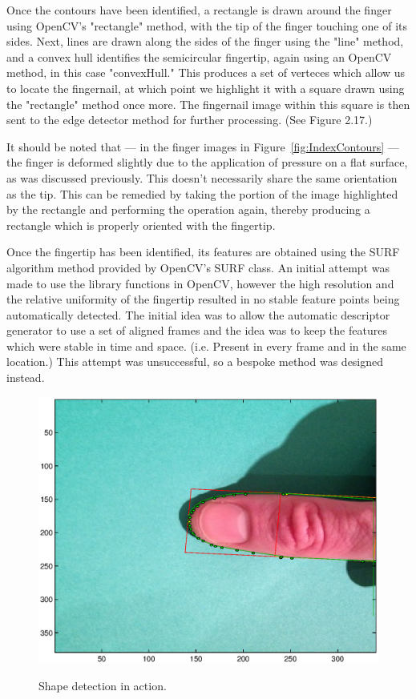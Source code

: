 Once the contours have been identified, a rectangle is drawn around the finger using OpenCV's "rectangle" method, with the tip of the finger touching one of its sides. Next, lines are drawn along the sides of the finger using the "line" method, and a convex hull identifies the semicircular fingertip, again using an OpenCV method, in this case "convexHull." This produces a set of verteces which allow us to locate the fingernail, at which point we highlight it with a square drawn using the "rectangle" method once more. The fingernail image within this square is then sent to the edge detector method for further processing. (See Figure 2.17.)

It should be noted that --- in the finger images in Figure~\ref{fig:IndexContours} --- the finger is deformed slightly due to the application of pressure on a flat surface, as was discussed previously. This doesn't necessarily share the same orientation as the tip. This can be remedied by taking the portion of the image highlighted by the rectangle and performing the operation again, thereby producing a rectangle which is properly oriented with the fingertip.

Once the fingertip has been identified, its features are obtained using the SURF algorithm method provided by OpenCV's SURF class. An initial attempt was made to use the library functions in OpenCV, however the high resolution and the relative uniformity of the fingertip resulted in no stable feature points being automatically detected. The initial idea was to allow the automatic descriptor generator to use a set of aligned frames and the idea was to keep the features which were stable in time and space. (i.e. Present in every frame and in the same location.) This attempt was unsuccessful, so a bespoke method was designed instead.

\begin{figure}[h!]
  \centering
    \includegraphics[width=\textwidth]{Chapter2/Figs/shapeDetection.eps}\label{fig:shapeDetection}
    \caption{Shape detection in action.}
\end{figure}

